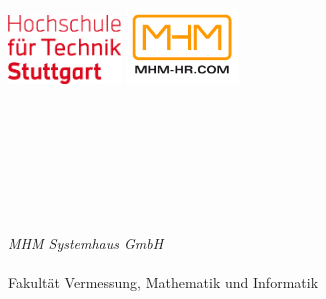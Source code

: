 \begin{titlepage}
	\begin{addmargin}[-1cm]{-3cm}
    \begin{center}
        \large
        \includegraphics[width=3cm]{gfx/hft_logo}
        \includegraphics[width=3cm]{gfx/mhm_logo}
         \\ \medskip  

        \hfill

        \vfill

        \begingroup
            \color{Maroon}\spacedallcaps{\myTitle} \\ \bigbreak
        \endgroup
        \mySubtitle
        \vfill 

        \spacedlowsmallcaps{\myName}


        

          
        \myDegree \\
        \bigskip \medskip
        \\
        \myProf \\
        \myOtherProf \\
        \bigskip
        \bigskip
         \\
        \textit{MHM Systemhaus GmbH}\\
        \bigskip
        \bigskip
         \\
        Fakultät Vermessung, Mathematik und Informatik\\        
        \bigskip
        \bigskip

        \myTime

        \vfill                      

    \end{center}  
  \end{addmargin}       
\end{titlepage}   